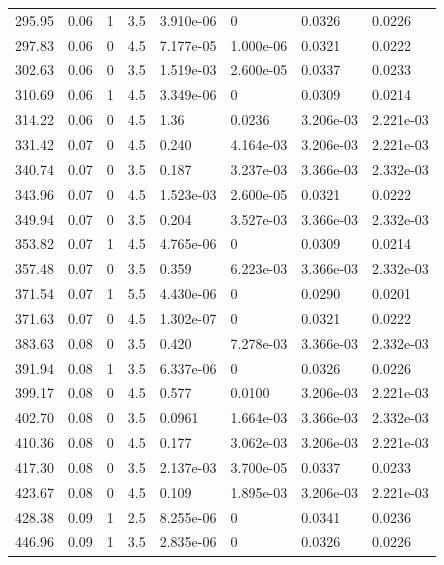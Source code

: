 \documentclass[preview]{standalone}
\begin{document}
{{{\begin{tabular}{L{1.2cm}C{1.2cm} C{0.3cm}C{0.5cm} C{1.4cm}C{1.4cm} C{1.4cm}C{1.4cm}}
  295.95  &  0.06  & 1     & 3.5 &  3.910e-06  & 0  & 0.0326 &  0.0226   \\ 
  297.83  &  0.06  & 0     & 4.5 &  7.177e-05  & 1.000e-06  & 0.0321 &  0.0222   \\ 
  302.63  &  0.06  & 0     & 3.5 &  1.519e-03  & 2.600e-05  & 0.0337 &  0.0233   \\ 
  310.69  &  0.06  & 1     & 4.5 &  3.349e-06  & 0  & 0.0309 &  0.0214   \\ 
  314.22  &  0.06  & 0     & 4.5 &  1.36  & 0.0236  & 3.206e-03 &  2.221e-03   \\ 
  331.42  &  0.07  & 0     & 4.5 &  0.240  & 4.164e-03  & 3.206e-03 &  2.221e-03   \\ 
  340.74  &  0.07  & 0     & 3.5 &  0.187  & 3.237e-03  & 3.366e-03 &  2.332e-03   \\ 
  343.96  &  0.07  & 0     & 4.5 &  1.523e-03  & 2.600e-05  & 0.0321 &  0.0222   \\ 
  349.94  &  0.07  & 0     & 3.5 &  0.204  & 3.527e-03  & 3.366e-03 &  2.332e-03   \\ 
  353.82  &  0.07  & 1     & 4.5 &  4.765e-06  & 0  & 0.0309 &  0.0214   \\ 
  357.48  &  0.07  & 0     & 3.5 &  0.359  & 6.223e-03  & 3.366e-03 &  2.332e-03   \\ 
  371.54  &  0.07  & 1     & 5.5 &  4.430e-06  & 0  & 0.0290 &  0.0201   \\ 
  371.63  &  0.07  & 0     & 4.5 &  1.302e-07  & 0  & 0.0321 &  0.0222   \\ 
  383.63  &  0.08  & 0     & 3.5 &  0.420  & 7.278e-03  & 3.366e-03 &  2.332e-03   \\ 
  391.94  &  0.08  & 1     & 3.5 &  6.337e-06  & 0  & 0.0326 &  0.0226   \\ 
  399.17  &  0.08  & 0     & 4.5 &  0.577  & 0.0100  & 3.206e-03 &  2.221e-03   \\ 
  402.70  &  0.08  & 0     & 3.5 &  0.0961  & 1.664e-03  & 3.366e-03 &  2.332e-03   \\ 
  410.36  &  0.08  & 0     & 4.5 &  0.177  & 3.062e-03  & 3.206e-03 &  2.221e-03   \\ 
  417.30  &  0.08  & 0     & 3.5 &  2.137e-03  & 3.700e-05  & 0.0337 &  0.0233   \\ 
  423.67  &  0.08  & 0     & 4.5 &  0.109  & 1.895e-03  & 3.206e-03 &  2.221e-03   \\ 
  428.38  &  0.09  & 1     & 2.5 &  8.255e-06  & 0  & 0.0341 &  0.0236   \\ 
  446.96  &  0.09  & 1     & 3.5 &  2.835e-06  & 0  & 0.0326 &  0.0226   \\ 

\end{tabular}}}}
\end{document}
